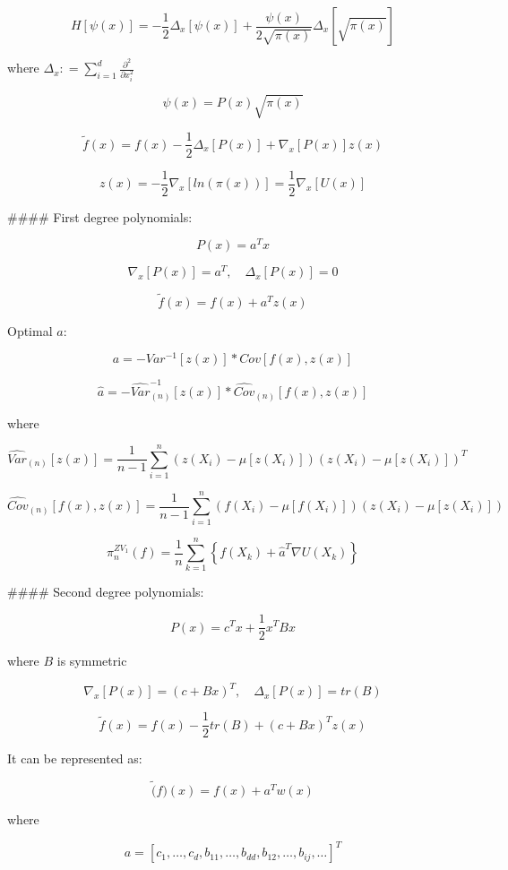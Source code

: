 \documentclass[a4paper]{article}
\begin{document}
$$H \left[ \psi(x)\right] = -\frac{1}{2} \Delta_x \left[\psi(x) \right] + \frac{\psi(x)}{2\sqrt{\pi(x)}} \Delta_x \left[ \sqrt{\pi(x)}\right]$$

where $\Delta_x : = \sum_{i = 1}^d \frac{\partial^2}{\partial x^2_i}$

$$\psi(x) = P(x)\sqrt{\pi(x)}$$

$$\tilde{f}(x) = f(x) - \frac{1}{2} \Delta_x \left[ P(x)\right] + \nabla_x \left[ P(x)\right] z(x)$$

$$z(x) = -\frac{1}{2} \nabla_x \left[ln (\pi(x)) \right] = \frac{1}{2} \nabla_x \left[U(x) \right]$$

#### First degree polynomials:

$$P(x) = a^T x$$

$$\nabla_x \left[ P(x)\right] = a^T, \quad \Delta_x \left[ P(x)\right] = 0$$

$$\tilde{f}(x) = f(x) + a^T z(x)$$

Optimal $a$:

$$a = - Var^{-1} \left[z(x) \right] * Cov \left[ f(x), z(x)\right]$$

$$\hat{a} = - \hat{Var}^{-1}_{(n)}\left[ z(x)\right] * \hat{Cov}_{(n)} \left[ f(x), z(x)\right]$$

where 

$$\hat{Var}_{(n)}\left[ z(x)\right] = \frac{1}{n-1} \sum_{i=1}^n \left( z(X_i) - \mu\left[ z(X_i) \right]\right) \left( z(X_i) - \mu \left[ z(X_i)\right]\right)^T$$

$$\hat{Cov}_{(n)} \left[ f(x), z(x)\right] = \frac{1}{n-1} \sum_{i=1}^n \left( f(X_i) - \mu \left[ f(X_i)\right]\right)\left( z(X_i) - \mu \left[ z(X_i)\right]\right)$$

$$\pi_n^{ZV_1}(f) = \frac{1}{n} \sum_{k=1}^n \left\{ f(X_k) + \hat{a}^T \nabla U(X_k)\right\}$$

#### Second degree polynomials:

$$P(x) = c^T x + \frac{1}{2} x^T B x$$

where $B$ is symmetric

$$\nabla_x \left[ P(x)\right] = (c + Bx)^T, \quad \Delta_x \left[ P(x)\right] = tr(B)$$

$$\tilde{f}(x) = f(x) - \frac{1}{2} tr(B) + (c + Bx)^T z(x)$$

It can be represented as:

$$\tilde(f)(x) = f(x) + a^T w(x)$$

where

$$a = \left[c_1, \dots, c_d, b_{11}, \dots, b_{dd}, b_{12}, \dots, b_{ij}, \dots \right]^T$$
\end{document}
